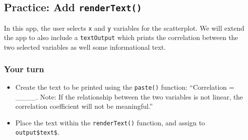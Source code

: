 \documentclass[
  letterpaper,
  DIV=11,
  numbers=noendperiod]{scrreprt}
\newenvironment{Shaded}{\begin{snugshade}}{\end{snugshade}}
\newcommand{\AttributeTok}[1]{\textcolor[rgb]{0.40,0.46,0.14}{#1}}
\newcommand{\CommentTok}[1]{\textcolor[rgb]{0.37,0.37,0.37}{#1}}
\newcommand{\ControlFlowTok}[1]{\textcolor[rgb]{0.00,0.46,0.62}{#1}}
\newcommand{\FunctionTok}[1]{\textcolor[rgb]{0.28,0.35,0.67}{#1}}
\newcommand{\NormalTok}[1]{\textcolor[rgb]{0.00,0.46,0.62}{#1}}
\newcommand{\OtherTok}[1]{\textcolor[rgb]{0.00,0.46,0.62}{#1}}
\newcommand{\SpecialCharTok}[1]{\textcolor[rgb]{0.37,0.37,0.37}{#1}}
\providecommand{\tightlist}{%
  \setlength{\itemsep}{0pt}\setlength{\parskip}{0pt}}
\begin{document}
\begin{Shaded}
\end{Shaded}

\hypertarget{practice-add-rendertext}{%
\subsection{\texorpdfstring{Practice: Add
\texttt{renderText()}}{Practice: Add renderText()}}\label{practice-add-rendertext}}

In this app, the user selects \texttt{x} and \texttt{y} variables for
the scatterplot. We will extend the app to also include a
\texttt{textOutput} which prints the correlation between the two
selected variables as well some informational text.

\hypertarget{your-turn-11}{%
\subsubsection{Your turn}\label{your-turn-11}}

\begin{itemize}
\tightlist
\item
  Create the text to be printed using the \texttt{paste()} function:
  ``Correlation = \_\_\_\_. Note: If the relationship between the two
  variables is not linear, the correlation coefficient will not be
  meaningful.''
\item
  Place the text within the \texttt{renderText()} function, and assign
  to \texttt{output\$text\$}.
\end{itemize}
\end{document}
